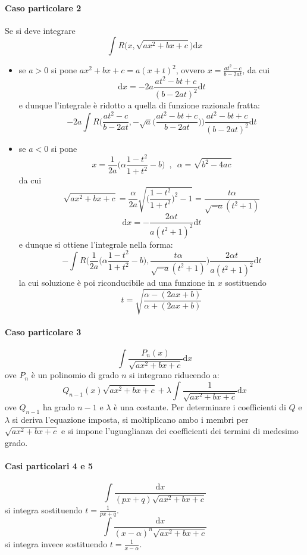 \documentclass[10pt]{article}
\theoremstyle{plain}
\begin{document}
\paragraph{Caso particolare 2}
Se si deve integrare
\[\int R\big(x, \sqrt{ax^2 +bx +c}\big)\textrm{d}x\]
\begin{itemize}
\item se $a > 0$ si pone $ax^2 + bx + c = a(x+t)^2$, ovvero $\displaystyle x = \frac{at^2 - c}{b - 2at}$, da cui
\[\textrm{d}x = - 2a \frac{at^2 - bt + c}{(b - 2at)^2	}\textrm{d}t\]
e dunque l'integrale è ridotto a quella di funzione razionale fratta:
\[-2a \int R \bigg(\frac{at^2 - c}{b - 2at}, - \sqrt{a}\big(\frac{at^2 - bt + c}{b-2at}\big)\bigg)\frac{at^2 - bt + c}{(b - 2at)^2	}\textrm{d}t\]
\item se $a < 0$ si pone
\[x = \frac{1}{2a} \big(\alpha \frac{1-t^2}{1+t^2} - b\big) \enspace, \enspace \alpha = \sqrt{b^2 - 4ac}\]
da cui
\[\sqrt{ax^2 + bx + c} = \frac{\alpha}{2a}\sqrt{\big(\frac{1-t^2}{1+t^2}\big)^2 - 1} = \frac{t\alpha}{\sqrt{-a}(t^2+1)}\]
\[\textrm{d}x = - \frac{2\alpha t}{a(t^2 + 1)^2}\textrm{d}t\]
e dunque si ottiene l'integrale nella forma:
\[- \int R \bigg(\frac{1}{2a} \big(\alpha \frac{1-t^2}{1+t^2} - b\big), \frac{t\alpha}{\sqrt{-a}(t^2+1)}\bigg)\frac{2\alpha t}{a(t^2+1)^2}\textrm{d}t\]
la cui soluzione è poi riconducibile ad una funzione in $x$ sostituendo
\[t = \sqrt{\frac{\alpha - (2ax + b)}{\alpha + (2ax + b)}}\]
\end{itemize}
\paragraph{Caso particolare 3}
\[\int\frac{P_n(x)}{\sqrt{ax^2 + bx + c}}\textrm{d}x\]
ove $P_n$ è un polinomio di grado $n$ si integrano riducendo a:
\[Q_{n-1}(x)\sqrt{ax^2 + bx + c} + \lambda \int\frac{1}{\sqrt{ax^2 + bx + c}}\textrm{d}x\]
ove $Q_{n-1}$ ha grado $n-1$ e $\lambda$ è una costante. Per determinare i coefficienti di $Q$ e $\lambda$ si deriva l'equazione imposta, si moltiplicano ambo i membri per $\sqrt{ax^2 + bx + c}$ e si impone l'uguaglianza dei coefficienti dei termini di medesimo grado.
\paragraph{Casi particolari 4 e 5}
\[\int\frac{\textrm{d}x}{(px + q)\sqrt{ax^2 + bx + c}}\]
si integra sostituendo $\displaystyle t = \frac{1}{px + q}$.
\[\int\frac{\textrm{d}x}{(x - \alpha)^n \sqrt{ax^2 + bx + c}}\]
si integra invece sostituendo $\displaystyle t = \frac{1}{x-\alpha}$.
\end{document}

